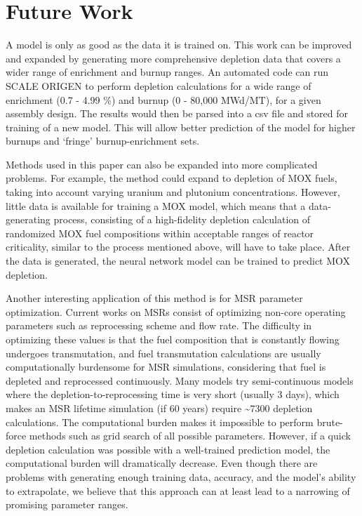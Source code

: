 \section{Future Work}

A model is only as good as the data it is trained on.
This work can be improved and expanded by generating
more comprehensive depletion data that covers a wider
range of enrichment and burnup ranges. An automated
code can run SCALE ORIGEN to perform depletion calculations
for a wide range of enrichment (0.7 - 4.99 \%) and burnup (0 - 80,000 MWd/MT),
for a given assembly design. The results
would then be parsed into a csv file and stored for
training of a new model. This will allow better
prediction of the model for higher burnups and `fringe'
burnup-enrichment sets.

Methods used in this paper can also be expanded into more
complicated problems. For example, the method
could expand to depletion of \gls{MOX} fuels, taking
into account varying uranium and plutonium concentrations.
However, little data is available
for training a \gls{MOX} model, which means that a
data-generating process, consisting of a high-fidelity
depletion calculation of randomized \gls{MOX} fuel
compositions within acceptable ranges of reactor
criticality, similar to the process mentioned above,
will have to take place. After the data
is generated, the neural network model can be trained
to predict \gls{MOX} depletion.

Another interesting application of this method is for
\gls{MSR} parameter optimization. Current works on
\glspl{MSR} consist of optimizing non-core operating
parameters such as reprocessing scheme and flow rate.
The difficulty in optimizing these values is that the
fuel composition that is constantly flowing undergoes
transmutation, and fuel transmutation calculations
are usually computationally burdensome for \gls{MSR}
simulations, considering that fuel is depleted and
reprocessed continuously. Many models try semi-continuous
models where the depletion-to-reprocessing time is
very short (usually 3 days), which makes an
\gls{MSR} lifetime simulation (if 60 years)
require \textasciitilde 7300 depletion calculations.
The computational burden
makes it impossible to perform brute-force methods
such as grid search of all possible parameters.
However, if a quick depletion calculation was possible
with a well-trained prediction model, the
computational burden will dramatically decrease.
Even though there are problems with generating enough
training data, accuracy, and the model's ability to
extrapolate, we believe that this approach can
at least lead to a narrowing of promising parameter
ranges.